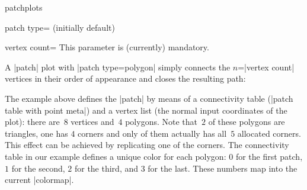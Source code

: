 {\begin{pgfplotslibrary}{patchplots}
\begin{pgfplotskey}{patch type= (initially default)}
\begin{pgfplotskey}{vertex count=}
		This parameter is (currently) mandatory.
	\end{pgfplotskey}
	A |patch| plot with |patch type=polygon| simply connects the $n$=|vertex count| vertices in their order of appearance and closes the resulting path:
\begin{codeexample}[]
\end{codeexample}
	\noindent The example above defines the |patch| by means of a connectivity table (|patch table with point meta|) and a vertex list (the normal input coordinates of the plot): there are~$8$ vertices and~$4$ polygons. Note that~$2$ of these polygons are triangles, one has $4$ corners and only of them actually has all~$5$ allocated corners. This effect can be achieved by replicating one of the corners. The connectivity table in our example defines a unique color for each polygon: $0$ for the first patch, $1$ for the second, $2$ for the third, and $3$ for the last. These numbers map into the current |colormap|.
	

\end{pgfplotskey}
\end{pgfplotslibrary}}
